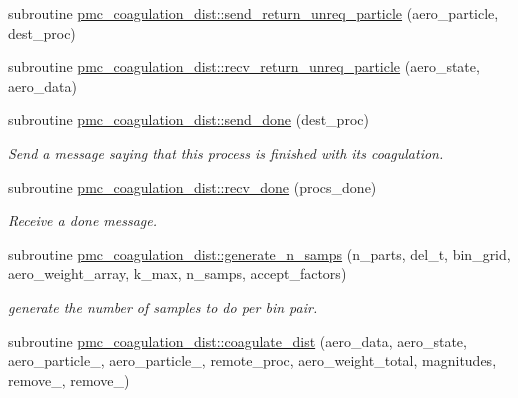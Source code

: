 \begin{DoxyCompactItemize}
\item 
subroutine \mbox{\hyperlink{namespacepmc__coagulation__dist_a2d80a8bdea3206f51071cbd58ac39e50}{pmc\+\_\+coagulation\+\_\+dist\+::send\+\_\+return\+\_\+unreq\+\_\+particle}} (aero\+\_\+particle, dest\+\_\+proc)
\item 
subroutine \mbox{\hyperlink{namespacepmc__coagulation__dist_a14c2a349dca62ade3455519ee9495562}{pmc\+\_\+coagulation\+\_\+dist\+::recv\+\_\+return\+\_\+unreq\+\_\+particle}} (aero\+\_\+state, aero\+\_\+data)
\item 
subroutine \mbox{\hyperlink{namespacepmc__coagulation__dist_a1e9943ac016e1a33aea378a2c03475c2}{pmc\+\_\+coagulation\+\_\+dist\+::send\+\_\+done}} (dest\+\_\+proc)
\begin{DoxyCompactList}\small\item\em Send a message saying that this process is finished with its coagulation. \end{DoxyCompactList}\item 
subroutine \mbox{\hyperlink{namespacepmc__coagulation__dist_aabf7ad0c151fc3f2bd7f9adad6791cc2}{pmc\+\_\+coagulation\+\_\+dist\+::recv\+\_\+done}} (procs\+\_\+done)
\begin{DoxyCompactList}\small\item\em Receive a done message. \end{DoxyCompactList}\item 
subroutine \mbox{\hyperlink{namespacepmc__coagulation__dist_a8a5dfc3b2ce4151e0b4010978fa5afa1}{pmc\+\_\+coagulation\+\_\+dist\+::generate\+\_\+n\+\_\+samps}} (n\+\_\+parts, del\+\_\+t, bin\+\_\+grid, aero\+\_\+weight\+\_\+array, k\+\_\+max, n\+\_\+samps, accept\+\_\+factors)
\begin{DoxyCompactList}\small\item\em generate the number of samples to do per bin pair. \end{DoxyCompactList}\item 
subroutine \mbox{\hyperlink{namespacepmc__coagulation__dist_a08afcc602f062f98712051fc31d30527}{pmc\+\_\+coagulation\+\_\+dist\+::coagulate\+\_\+dist}} (aero\+\_\+data, aero\+\_\+state, aero\+\_\+particle\+\_, aero\+\_\+particle\+\_, remote\+\_\+proc, aero\+\_\+weight\+\_\+total, magnitudes, remove\+\_, remove\+\_)
\end{DoxyCompactItemize}
